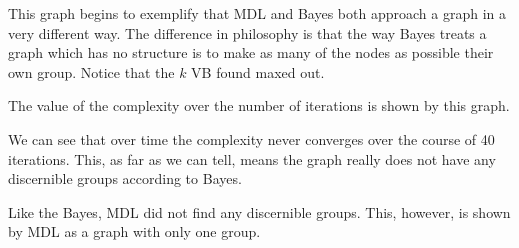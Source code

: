 
This graph begins to exemplify that MDL and Bayes both approach a graph
in a very different way. The difference in philosophy is that the way Bayes
treats a graph which has no structure is to make as many of the nodes as possible
their own group. Notice that the $k$ VB found maxed out. 

The value of the complexity over the number of iterations is shown by this graph.


We can see that over time the complexity never converges over the course of 40 iterations.
This, as far as we can tell, means the graph really does not have any discernible groups according
to Bayes.

Like the Bayes, MDL did not find any discernible groups. This, however, is shown
by MDL as a graph with only one group.
